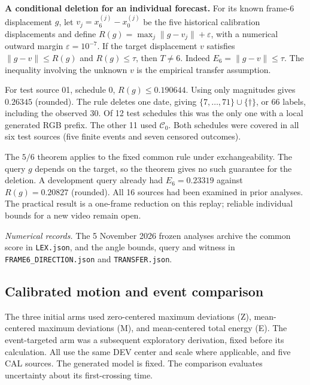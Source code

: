 \documentclass[11pt]{article}
\theoremstyle{noteplain}
\newcommand{\norm}[1]{\lVert #1\rVert}
\newcommand{\dates}[2]{\{#1,\ldots,#2\}}
\newcommand{\dd}{\dagger}
\begin{document}
\textbf{A conditional deletion for an individual forecast.}
For its known frame-6 displacement $g$, let $v_j=x^{(j)}_6-x^{(j)}_0$ be the five historical calibration displacements and define $R(g)=\max_j\norm{g-v_j}+\varepsilon$, with a numerical outward margin $\varepsilon=10^{-7}$. If the target displacement $v$ satisfies $\norm{g-v}\le R(g)$ and $R(g)\le\tau$, then $T\ne6$. Indeed $E_6=\norm{g-v}\le\tau$. The inequality involving the unknown $v$ is the empirical transfer assumption.

For test source 01, schedule 0, $R(g)\le0.190644$. Using only magnitudes gives $0.26345$ (rounded). The rule deletes one date, giving $\dates{7}{71}\cup\{\dd\}$, or 66 labels, including the observed 30. Of 12 test schedules this was the only one with a local generated RGB prefix. The other 11 used $\mathcal C_0$. Both schedules were covered in all six test sources (five finite events and seven censored outcomes).

The $5/6$ theorem applies to the fixed common rule under exchangeability. The query $g$ depends on the target, so the theorem gives no such guarantee for the deletion. A development query already had $E_6=0.23319$ against $R(g)=0.20827$ (rounded). All 16 sources had been examined in prior analyses. The practical result is a one-frame reduction on this replay; reliable individual bounds for a new video remain open.

{\footnotesize\emph{Numerical records.} The 5 November 2026 frozen analyses archive the common score in \texttt{LEX.json}, and the angle bounds, query and witness in \texttt{FRAME6\_DIRECTION.json} and \texttt{TRANSFER.json}.}
\subsection{Calibrated motion and event comparison}
The three initial arms used zero-centered maximum deviations (Z), mean-centered maximum deviations (M), and mean-centered total energy (E). The event-targeted arm was a subsequent exploratory derivation, fixed before its calculation. All use the same DEV center and scale where applicable, and five CAL sources. The generated model is fixed. The comparison evaluates uncertainty about its first-crossing time.
\end{document}
